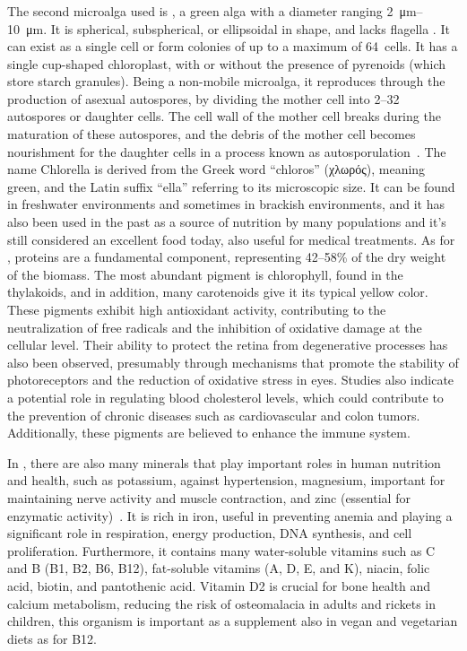 \subsubsection{}
The second microalga used is , a green alga with a diameter ranging \qtyrange{2}{10}{\micro\metre}. It is spherical, subspherical, or ellipsoidal in shape, and lacks flagella . It can exist as a single cell or form colonies of up to a maximum of \qty{64}{cells}. It has a single cup-shaped chloroplast, with or without the presence of pyrenoids (which store starch granules). Being a non-mobile microalga, it reproduces through the production of asexual autospores, by dividing the mother cell into 2–32\zxriv{} autospores or daughter cells. The cell wall of the mother cell breaks during the maturation of these autospores, and the debris of the mother cell becomes nourishment for the daughter cells in a process known as autosporulation~\parencite{ru_Chlorella_2020}. The name Chlorella is derived from the Greek word “chloros” (χλωρός), meaning green, and the Latin suffix “ella” referring to its microscopic size. It can be found in freshwater environments and sometimes in brackish environments, and it has also been used in the past as a source of nutrition by many populations and it’s still considered an excellent food today, also useful for medical treatments. As for , proteins are a fundamental component, representing \numrange{42}{58}\%\zxriv{} of the dry weight of the biomass. The most abundant pigment is chlorophyll, found in the thylakoids, and in addition, many carotenoids give it its typical yellow color. These pigments exhibit high antioxidant activity, contributing to the neutralization of free radicals and the inhibition of oxidative damage at the cellular level. Their ability to protect the retina from degenerative processes has also been observed, presumably through mechanisms that promote the stability of photoreceptors and the reduction of oxidative stress in eyes. Studies also indicate a potential role in regulating blood cholesterol levels, which could contribute to the prevention of chronic diseases such as cardiovascular and colon tumors. Additionally, these pigments are believed to enhance the immune system.

In , there are also many minerals that play important roles in human nutrition and health, such as potassium, against hypertension, magnesium, important for maintaining nerve activity and muscle contraction, and zinc (essential for enzymatic activity)~\parencite{safi_Morphology_2014}\zxriv{}. It is rich in iron, useful in preventing anemia and playing a significant role in respiration, energy production, DNA synthesis, and cell proliferation. Furthermore, it contains many water-soluble vitamins such as C and B (B1, B2, B6, B12), fat-soluble vitamins (A, D, E, and K), niacin, folic acid, biotin, and pantothenic acid. Vitamin D2 is crucial for bone health and calcium metabolism, reducing the risk of osteomalacia in adults and rickets in children, this organism is important as a supplement also in vegan and vegetarian diets as for B12.

